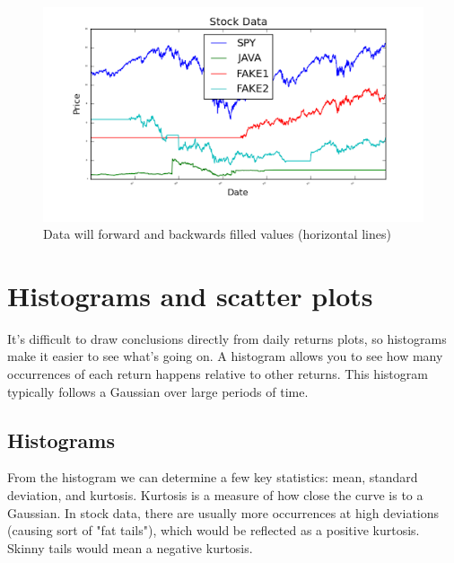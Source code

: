 \begin{figure}[h!]
	\centering
	\includegraphics[width=\textwidth]{images/filled_data.png}
    \caption{Data will forward and backwards filled values (horizontal lines)}
\end{figure}
\newpage

\section{Histograms and scatter plots}
\noindent It's difficult to draw conclusions directly from daily returns plots, so histograms make it easier to see what's going on. A histogram allows you to see how many occurrences of each return happens relative to other returns. This histogram typically follows a Gaussian over large periods of time.\\

\subsection{Histograms}

\noindent From the histogram we can determine a few key statistics: mean, standard deviation, and kurtosis. Kurtosis is a measure of how close the curve is to a Gaussian. In stock data, there are usually more occurrences at high deviations (causing sort of "fat tails"), which would be reflected as a positive kurtosis. Skinny tails would mean a negative kurtosis.

